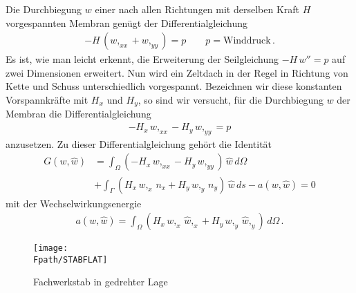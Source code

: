 Die Durchbiegung $w$ einer nach allen Richtungen mit derselben Kraft $H$ vorgespannten
Membran gen\"{u}gt der Differentialgleichung
\begin{align}
- H\,(w,_{xx} + w,_{yy}) = p \qquad p = \mbox{Winddruck}\,.
\end{align}
Es ist, wie man leicht erkennt, die Erweiterung der Seilgleichung $- H\,w'' = p$ auf zwei Dimensionen erweitert. Nun wird ein Zeltdach in der Regel in Richtung von Kette und Schuss unterschiedlich vorgespannt. Bezeichnen wir diese konstanten Vorspannkr\"{a}fte mit $H_x$ und $H_y$, so sind wir versucht, f\"{u}r die Durchbiegung $w$ der Membran die Differentialgleichung
\begin{align}
- H_x\,w,_{xx} - H_y\,w,_{yy} = p
\end{align}
anzusetzen. Zu dieser Differentialgleichung geh\"{o}rt die Identit\"{a}t
\begin{align}
G(w,\hat{w}) &= \int_{\Omega} (- H_x\,w,_{xx} - H_y\,w,_{yy})\,\hat{w}\,d\Omega \\
&+ \int_{\Gamma} (H_x\,w,_x\,n_x + H_y\,w,_y\,n_y)\,\hat{w}\,ds - a(w,\hat{w}) = 0
\end{align}
mit der Wechselwirkungsenergie
\begin{align}
a(w,\hat{w}) = \int_{\Omega} (H_x\,w,_x\,\hat{w},_x + H_y\,w,_y\,\hat{w},_y)\,d\Omega\,.
\end{align}
\begin{figure}[tbp] \centering
\if {} \sidecaption \fi
\texttt{[image: \\Fpath/STABFLAT]}
\caption{Fachwerkstab in gedrehter Lage}  \label{Stabflat}
\end{figure}%

